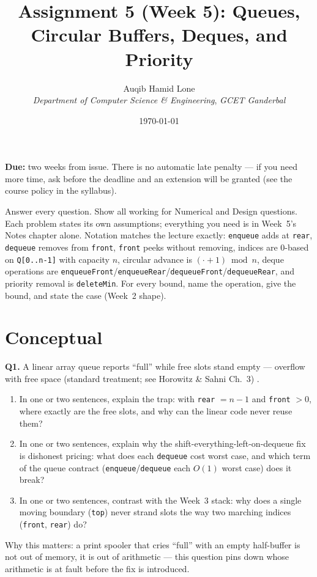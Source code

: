 \documentclass[11pt]{article}
\title{Assignment 5 (Week 5): Queues, Circular Buffers, Deques, and Priority}
\author{Auqib Hamid Lone\\[0.3em]
  \emph{Department of Computer Science \& Engineering}, \emph{GCET Ganderbal}}
\date{\today}
\begin{document}
\maketitle

\noindent\textbf{Due:} two weeks from issue. There is no automatic late penalty --- if you need more time, ask before the deadline and an extension will be granted (see the course policy in the syllabus).

\noindent Answer every question. Show all working for Numerical and Design questions. Each problem states its own assumptions; everything you need is in Week~5's Notes chapter alone. Notation matches the lecture exactly: \texttt{enqueue} adds at \texttt{rear}, \texttt{dequeue} removes from \texttt{front}, \texttt{front} peeks without removing, indices are 0-based on \texttt{Q[0..n-1]} with capacity $n$, circular advance is $(\cdot + 1) \bmod n$, deque operations are \texttt{enqueueFront}/\texttt{enqueueRear}/\texttt{dequeueFront}/\texttt{dequeueRear}, and priority removal is \texttt{deleteMin}. For every bound, name the operation, give the bound, and state the case (Week~2 shape).

\section{Conceptual}

\textbf{Q1.} A linear array queue reports ``full'' while free slots stand empty --- overflow with free space (standard treatment; see Horowitz \& Sahni Ch.~3) \cite{HorowitzSahni2008_fundamentals_data_structures}.
\begin{enumerate}
  \item[(a)] In one or two sentences, explain the  trap: with \texttt{rear} $= n - 1$ and \texttt{front} $> 0$, where exactly are the free slots, and why can the linear code never reuse them?
  \item[(b)] In one or two sentences, explain why the shift-everything-left-on-dequeue fix is dishonest pricing: what does each \texttt{dequeue} cost worst case, and which term of the queue contract (\texttt{enqueue}/\texttt{dequeue} each $O(1)$ worst case) does it break?
  \item[(c)] In one or two sentences, contrast with the Week~3 stack: why does a single moving boundary (\texttt{top}) never strand slots the way two marching indices (\texttt{front}, \texttt{rear}) do?
\end{enumerate}
Why this matters: a print spooler that cries ``full'' with an empty half-buffer is not out of memory, it is out of arithmetic --- this question pins down whose arithmetic is at fault before the fix is introduced.
\end{document}
